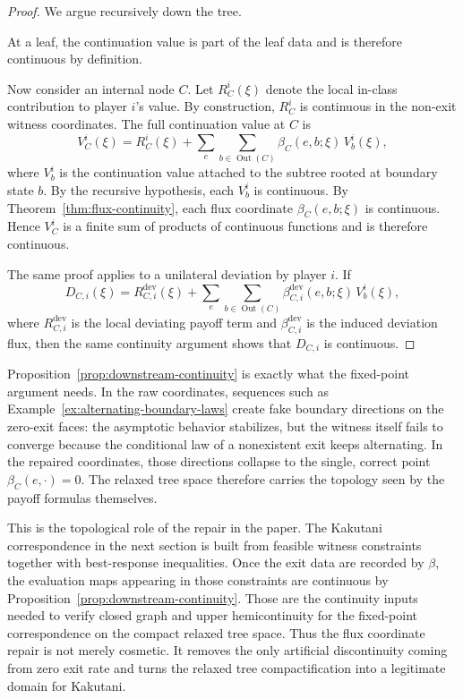 \documentclass[12pt,a4paper]{article}
\theoremstyle{definition}
\DeclareMathOperator{\Out}{Out}
\begin{document}
\begin{proof}
We argue recursively down the tree.

At a leaf, the continuation value is part of the leaf data and is therefore continuous by definition.

Now consider an internal node $C$. Let $R_C^i(\xi)$ denote the local in-class contribution to player $i$'s value. By construction, $R_C^i$ is continuous in the non-exit witness coordinates. The full continuation value at $C$ is
\[
V_C^i(\xi)
=
R_C^i(\xi)
+
\sum_e\sum_{b\in \Out(C)} \beta_C(e,b;\xi)\,V_b^i(\xi),
\]
where $V_b^i$ is the continuation value attached to the subtree rooted at boundary state $b$. By the recursive hypothesis, each $V_b^i$ is continuous. By Theorem~\ref{thm:flux-continuity}, each flux coordinate $\beta_C(e,b;\xi)$ is continuous. Hence $V_C^i$ is a finite sum of products of continuous functions and is therefore continuous.

The same proof applies to a unilateral deviation by player $i$. If
\[
D_{C,i}(\xi)
=
R_{C,i}^{\mathrm{dev}}(\xi)
+
\sum_e\sum_{b\in \Out(C)} \beta_{C,i}^{\mathrm{dev}}(e,b;\xi)\,V_b^i(\xi),
\]
where $R_{C,i}^{\mathrm{dev}}$ is the local deviating payoff term and $\beta_{C,i}^{\mathrm{dev}}$ is the induced deviation flux, then the same continuity argument shows that $D_{C,i}$ is continuous.
\end{proof}

Proposition~\ref{prop:downstream-continuity} is exactly what the fixed-point argument needs. In the raw coordinates, sequences such as Example~\ref{ex:alternating-boundary-laws} create fake boundary directions on the zero-exit faces: the asymptotic behavior stabilizes, but the witness itself fails to converge because the conditional law of a nonexistent exit keeps alternating. In the repaired coordinates, those directions collapse to the single, correct point $\beta_C(e,\cdot)=0$. The relaxed tree space therefore carries the topology seen by the payoff formulas themselves.

This is the topological role of the repair in the paper. The Kakutani correspondence in the next section is built from feasible witness constraints together with best-response inequalities. Once the exit data are recorded by $\beta$, the evaluation maps appearing in those constraints are continuous by Proposition~\ref{prop:downstream-continuity}. Those are the continuity inputs needed to verify closed graph and upper hemicontinuity for the fixed-point correspondence on the compact relaxed tree space. Thus the flux coordinate repair is not merely cosmetic. It removes the only artificial discontinuity coming from zero exit rate and turns the relaxed tree compactification into a legitimate domain for Kakutani.
\end{document}
